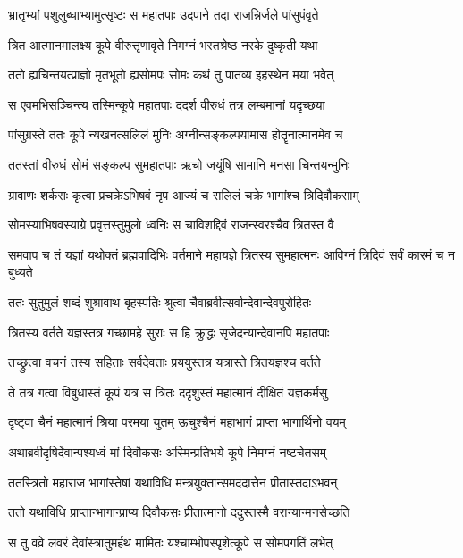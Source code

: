 \twolineshloka
{भ्रातृभ्यां पशुलुब्धाभ्यामुत्सृष्टः स महातपाः}
{उदपाने तदा राजन्निर्जले पांसुपंवृते}


\twolineshloka
{त्रित आत्मानमालक्ष्य कूपे वीरुत्तृणावृते}
{निमग्नं भरतश्रेष्ठ नरके दुष्कृती यथा}


\twolineshloka
{ततो ह्यचिन्तयत्प्राज्ञो मृतभूतो ह्यसोमपः}
{सोमः कथं तु पातव्य इहस्थेन मया भवेत्}


\twolineshloka
{स एवमभिसञ्चिन्त्य तस्मिन्कूपे महातपाः}
{ददर्श वीरुधं तत्र लम्बमानां यदृच्छया}


\twolineshloka
{पांसुग्रस्ते ततः कूपे न्यखनत्सलिलं मुनिः}
{अग्नीन्सङ्कल्पयामास होतॄनात्मानमेव च}


\twolineshloka
{ततस्तां वीरुधं सोमं सङ्कल्प सुमहातपाः}
{ऋचो जयूंषि सामानि मनसा चिन्तयन्मुनिः}


\twolineshloka
{ग्रावाणः शर्कराः कृत्वा प्रचक्रेऽभिषवं नृप}
{आज्यं च सलिलं चक्रे भागांश्च त्रिदिवौकसाम्}


\twolineshloka
{सोमस्याभिषवस्याग्रे प्रवृत्तस्तुमुलो ध्वनिः}
{स चाविशद्दिवं राजन्स्वरश्चैव त्रितस्त वै}


समवाप च तं यज्ञां यथोक्तं ब्रह्मवादिभिः
\twolineshloka
{वर्तमाने महायज्ञे त्रितस्य सुमहात्मनः}
{आविग्नं त्रिदिवं सर्वं कारमं च न बुध्यते}


\twolineshloka
{ततः सुतुमुलं शब्दं शुश्रावाथ बृहस्पतिः}
{श्रुत्वा चैवाब्रवीत्सर्वान्देवान्देवपुरोहितः}


\twolineshloka
{त्रितस्य वर्तते यज्ञस्तत्र गच्छामहे सुराः}
{स हि क्रुद्धः सृजेदन्यान्देवानपि महातपाः}


\twolineshloka
{तच्छ्रुत्वा वचनं तस्य सहिताः सर्वदेवताः}
{प्रययुस्तत्र यत्रास्ते त्रितयज्ञश्च वर्तते}


\twolineshloka
{ते तत्र गत्वा विबुधास्तं कूपं यत्र स त्रितः}
{ददृशुस्तं महात्मानं दीक्षितं यज्ञकर्मसु}


\twolineshloka
{दृष्ट्वा चैनं महात्मानं श्रिया परमया युतम्}
{ऊचुश्चैनं महाभागं प्राप्ता भागार्थिनो वयम्}


\twolineshloka
{अथाब्रवीदृषिर्देवान्पश्यध्वं मां दिवौकसः}
{अस्मिन्प्रतिभये कूपे निमग्नं नष्टचेतसम्}


\twolineshloka
{ततस्त्रितो महाराज भागांस्तेषां यथाविधि}
{मन्त्रयुक्तान्समददात्तेन प्रीतास्तदाऽभवन्}


\twolineshloka
{ततो यथाविधि प्राप्तान्भागान्प्राप्य दिवौकसः}
{प्रीतात्मानो ददुस्तस्मै वरान्यान्मनसेच्छति}


\twolineshloka
{स तु वव्रे लवरं देवांस्त्रातुमर्हथ मामितः}
{यश्चाम्भोपस्पृशेत्कूपे स सोमपगतिं लभेत्}


